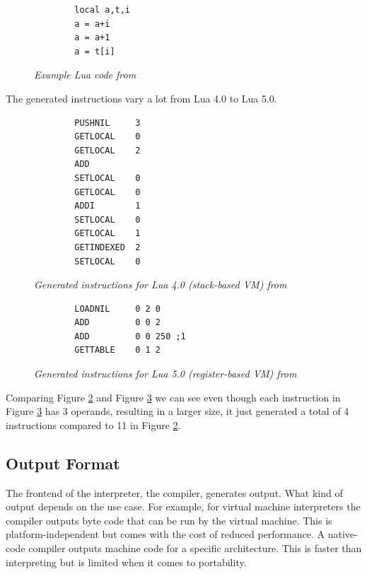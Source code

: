 \documentclass{article}
\begin{document}
\begin{figure}[ht]
    \begin{verbatim}
        local a,t,i
        a = a+i
        a = a+1
        a = t[i]
    \end{verbatim}
    \caption{\textit{Example Lua code from ~\cite{lua_implementation}}}
    \label{fig:lua_code}
\end{figure}

The generated instructions vary a lot from Lua 4.0 to Lua 5.0.

\begin{figure}[ht]
    \begin{verbatim}
        PUSHNIL     3
        GETLOCAL    0
        GETLOCAL    2
        ADD
        SETLOCAL    0
        GETLOCAL    0
        ADDI        1
        SETLOCAL    0
        GETLOCAL    1
        GETINDEXED  2
        SETLOCAL    0
    \end{verbatim}
    \caption{\textit{Generated instructions for Lua 4.0 (stack-based VM) from ~\cite{lua_implementation}}}
    \label{fig:lua_generated4}
\end{figure}


\begin{figure}[ht]
    \begin{verbatim}
        LOADNIL     0 2 0
        ADD         0 0 2
        ADD         0 0 250 ;1
        GETTABLE    0 1 2
    \end{verbatim}
    \caption{\textit{Generated instructions for Lua 5.0 (register-based VM) from ~\cite{lua_implementation}}}
    \label{fig:lua_generated5}
\end{figure}

Comparing Figure \ref{fig:lua_generated4} and Figure \ref{fig:lua_generated5}
we can see even though each instruction in Figure \ref{fig:lua_generated5} has
3 operands, resulting in a larger size, it just generated a total of 4
instructions compared to 11 in Figure \ref{fig:lua_generated4}.

\subsection{Output Format}
The frontend of the interpreter, the compiler, generates output. What kind of
output depends on the use case. For example, for virtual machine interpreters
the compiler outputs byte code that can be run by the virtual machine. This is
platform-independent but comes with the cost of reduced performance. A
native-code compiler outputs machine code for a specific architecture. This is
faster than interpreting but is limited when it comes to portability.
~\cite{vmgen}
\end{document}
